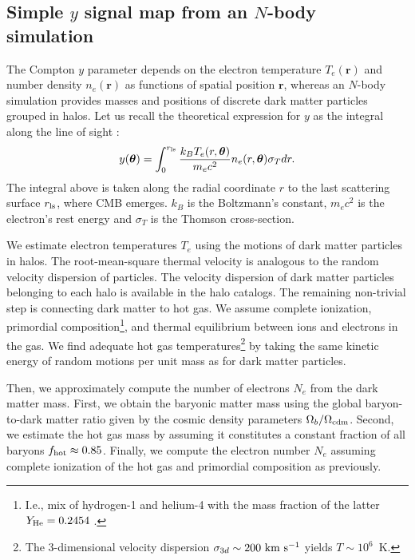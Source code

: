 \subsection{Simple \texorpdfstring{$y$}{y} signal map from an \texorpdfstring{$N$}{N}-body simulation}

The Compton $y$ parameter depends on the electron temperature $T_e(\bm r)$ and number density $n_e(\bm r)$ as functions of spatial position $\bm r$, whereas an $N$-body simulation provides masses and positions of discrete dark matter particles grouped in halos.
Let us recall the theoretical expression for $y$ as the integral along the line of sight \citep{Planck-SZ-map,Sunyaev-Zeldovich-1972}:
\begin{equation} \label{eq:y-parameter}
    y\qty(\bm \theta) = \int_0^{r_{\rm ls}} \frac{k_B T_e\qty(r, \bm \theta)}{m_e c^2} n_e\qty(r, \bm \theta) \sigma_T dr.
\end{equation}
The integral above is taken along the radial coordinate $r$ to the last scattering surface $r_{\rm ls}$, where CMB emerges.
$k_B$ is the Boltzmann's constant, $m_e c^2$ is the electron's rest energy and $\sigma_T$ is the Thomson cross-section.

We estimate electron temperatures $T_e$ using the motions of dark matter particles in halos.
The root-mean-square thermal velocity is analogous to the random velocity dispersion of particles.
The velocity dispersion of dark matter particles belonging to each halo is available in the \abacussummit{} \compaso{} halo catalogs.
The remaining non-trivial step is connecting dark matter to hot gas.
We assume complete ionization, primordial composition\footnote{I.e., mix of hydrogen-1 and helium-4 with the mass fraction of the latter $Y_{\rm He} = 0.2454$ \citep{Planck2018-cosmo}.}, and thermal equilibrium between ions and electrons in the gas.
We find adequate hot gas temperatures\footnote{The 3-dimensional velocity dispersion $\sigma_{3d}\sim 200~{\rm km~s^{-1}}$ yields $T\sim 10^6$~K.} by taking the same kinetic energy of random motions per unit mass as for dark matter particles.

Then, we approximately compute the number of electrons $N_e$ from the dark matter mass.
First, we obtain the baryonic matter mass using the global baryon-to-dark matter ratio given by the cosmic density parameters $\Omega_b/\Omega_{\rm cdm}$.
Second, we estimate the hot gas mass by assuming it constitutes a constant fraction of all baryons $f_{\rm hot}\approx 0.85$.
Finally, we compute the electron number $N_e$ assuming complete ionization of the hot gas and primordial composition as previously.

